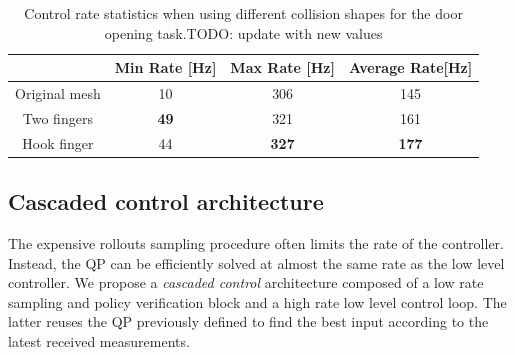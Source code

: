 \begin{table}[h!]
    \centering
    \begin{tabular}{c|c|c|c}
             &  Min Rate [Hz] & Max Rate [Hz]& Average Rate[Hz]\\
                       \hline
         Original mesh & 10 & 306 & 145 \\
         Two fingers & \textbf{49} & 321 & 161 \\
         Hook finger & 44 & \textbf{327} & \textbf{177} \\
    \end{tabular}
    \caption{Control rate statistics when using different collision shapes for the door opening task.TODO: update with new values}
    \label{tab:rate_stat}
\end{table}

 
\subsection{Cascaded control architecture}
The expensive rollouts sampling procedure often limits the rate of the controller. Instead, the QP can be efficiently solved at almost the same rate as the low level controller. We propose a \emph{cascaded control} architecture composed of a low rate sampling and policy verification block and a high rate low level control loop. The latter reuses the QP previously defined to find the best input according to the latest received measurements. 
